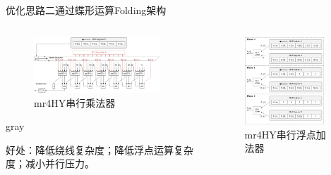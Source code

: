 \documentclass[8pt]{ctexbeamer}
\renewenvironment{quote}
{
	\begin{notebox}{gray}
}
{
	\end{notebox}
}
\begin{document}
\begin{frame}{优化思路二}{通过蝶形运算Folding架构}
	\begin{columns}
		\begin{column}{0.5\textwidth}
			\begin{center}
				\begin{figure}
					\centering
					\includegraphics[width=0.9\textwidth]{figure/Figure2.Multiplier.png}
					\caption{mr4HY串行乘法器}
					\label{fig:Multiplier}
				\end{figure}
			\end{center}
			\begin{quote}
				好处：降低绕线复杂度；降低浮点运算复杂度；减小并行压力。
			\end{quote}
		\end{column}
		\begin{column}{0.5\textwidth}
			\begin{center}
				\begin{figure}
					\centering
					\includegraphics[width=0.9\textwidth]{figure/Figure3.Float_Adder.png}
					\caption{mr4HY串行浮点加法器}
					\label{fig:Adder}
				\end{figure}
			\end{center}
		\end{column}
	\end{columns}

\end{frame}
\end{document}
